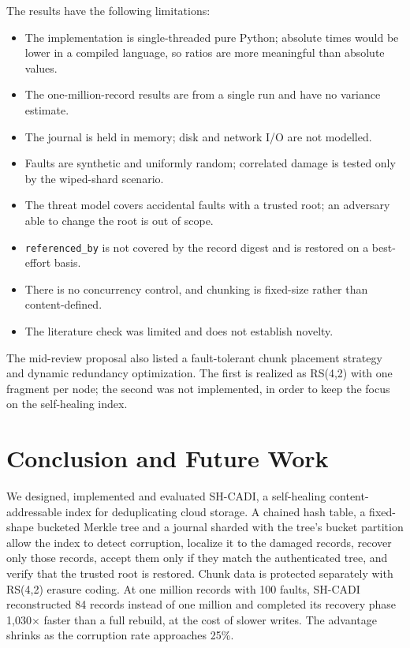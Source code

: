 \documentclass[conference]{IEEEtran}
\newcommand{\code}[1]{\texttt{#1}}
\begin{document}
The results have the following limitations:
\begin{itemize}
\item The implementation is single-threaded pure Python; absolute times would be lower in a compiled language, so ratios are more meaningful than absolute values.
\item The one-million-record results are from a single run and have no variance estimate.
\item The journal is held in memory; disk and network I/O are not modelled.
\item Faults are synthetic and uniformly random; correlated damage is tested only by the wiped-shard scenario.
\item The threat model covers accidental faults with a trusted root; an adversary able to change the root is out of scope.
\item \code{referenced\_by} is not covered by the record digest and is restored on a best-effort basis.
\item There is no concurrency control, and chunking is fixed-size rather than content-defined.
\item The literature check was limited and does not establish novelty.
\end{itemize}

The mid-review proposal also listed a fault-tolerant chunk placement strategy and dynamic redundancy optimization. The first is realized as RS(4,2) with one fragment per node; the second was not implemented, in order to keep the focus on the self-healing index.

\section{Conclusion and Future Work}
\label{sec:conclusion}

We designed, implemented and evaluated SH-CADI, a self-healing content-addressable index for deduplicating cloud storage. A chained hash table, a fixed-shape bucketed Merkle tree and a journal sharded with the tree's bucket partition allow the index to detect corruption, localize it to the damaged records, recover only those records, accept them only if they match the authenticated tree, and verify that the trusted root is restored. Chunk data is protected separately with RS(4,2) erasure coding. At one million records with 100 faults, SH-CADI reconstructed 84 records instead of one million and completed its recovery phase 1,030$\times$ faster than a full rebuild, at the cost of slower writes. The advantage shrinks as the corruption rate approaches 25\%.
\end{document}
